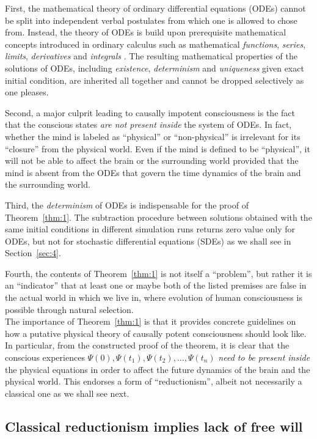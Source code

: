 \documentclass{ws-ijmpb}
\begin{document}
First, the mathematical theory of ordinary differential equations
(ODEs) cannot be split into independent verbal postulates from which
one is allowed to chose from. Instead, the theory of ODEs is build
upon prerequisite mathematical concepts introduced in ordinary calculus
such as mathematical \emph{functions}, \emph{series}, \emph{limits}, \emph{derivatives} and \emph{integrals}
\cite{Strang1991}. The resulting mathematical properties of the solutions
of ODEs, including \emph{existence}, \emph{determinism} and \emph{uniqueness} given exact
initial condition, are inherited all together and cannot be dropped
selectively as one pleases.

Second, a major culprit leading to causally impotent consciousness
is the fact that the conscious states \emph{are not present inside} the system
of ODEs. In fact, whether the mind is labeled as ``physical''
or ``non-physical'' is irrelevant for its ``closure''
from the physical world. Even if the mind is defined to be ``physical'',
it will not be able to affect the brain or the surrounding world provided
that the mind is absent from the ODEs that govern the time dynamics
of the brain and the surrounding world.

Third, the \emph{determinism} of ODEs is indispensable for the proof
of Theorem~\ref{thm:1}. The subtraction procedure between solutions
obtained with the same initial conditions in different simulation
runs returns zero value only for ODEs, but not for stochastic differential
equations (SDEs) as we shall see in Section~\ref{sec:4}.

Fourth, the contents of Theorem~\ref{thm:1} is not itself a ``problem'',
but rather it is an ``indicator'' that at least one or maybe
both of the listed premises are false in the actual world in which
we live in, where evolution of human consciousness is possible through
natural selection.\\


The importance of Theorem~\ref{thm:1} is that it provides concrete guidelines on how a putative physical
theory of causally potent consciousness should look like. In particular,
from the constructed proof of the theorem, it is clear that the conscious
experiences $\Psi(0),\Psi(t_1),\Psi(t_2),\ldots,\Psi(t_n)$ \emph{need to be present inside}
the physical equations in order to affect the future dynamics of the
brain and the physical world. This endorses a form of ``reductionism'',
albeit not necessarily a classical one as we shall see next.


\subsection{Classical reductionism implies lack of free will}
\label{sub:32}
\end{document}
